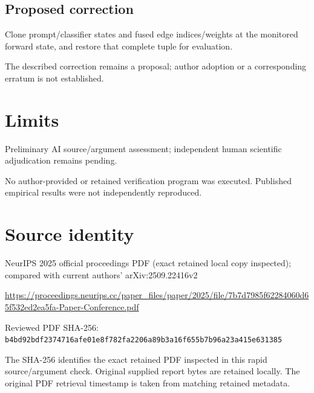 \documentclass[11pt]{article}
\begin{document}
\subsection*{Proposed correction}

Clone prompt/classifier states and fused edge indices/weights at the monitored forward state, and restore that complete tuple for evaluation.

The described correction remains a proposal; author adoption or a corresponding erratum is not established.

\section*{Limits}

Preliminary AI source/argument assessment; independent human scientific adjudication remains pending.\par

No author-provided or retained verification program was executed. Published empirical results were not independently reproduced.\par

\section*{Source identity}

NeurIPS 2025 official proceedings PDF (exact retained local copy inspected); compared with current authors’ arXiv:2509.22416v2

\url{https://proceedings.neurips.cc/paper_files/paper/2025/file/7b7d7985f62284060d65f532ed2ea5fa-Paper-Conference.pdf}

Reviewed PDF SHA-256: \nolinkurl{b4bd92bdf2374716afe01e8f782fa2206a89b3a16f655b7b96a23a415e631385}

The SHA-256 identifies the exact retained PDF inspected in this rapid source/argument check. Original supplied report bytes are retained locally. The original PDF retrieval timestamp is taken from matching retained metadata.
\end{document}
